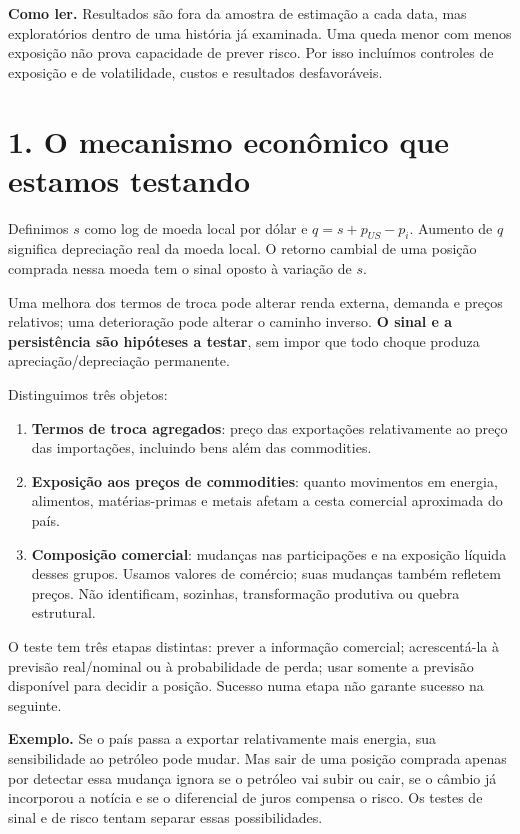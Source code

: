 \documentclass[11pt,a4paper]{article}
\begin{document}
\textbf{Como ler.} Resultados são fora da amostra de estimação a cada data, mas exploratórios dentro de uma história já examinada. Uma queda menor com menos exposição não prova capacidade de prever risco. Por isso incluímos controles de exposição e de volatilidade, custos e resultados desfavoráveis.

\clearpage
\section*{1. O mecanismo econômico que estamos testando}

Definimos $s$ como log de moeda local por dólar e $q=s+p_{US}-p_i$. Aumento de $q$ significa depreciação real da moeda local. O retorno cambial de uma posição comprada nessa moeda tem o sinal oposto à variação de $s$.

Uma melhora dos termos de troca pode alterar renda externa, demanda e preços relativos; uma deterioração pode alterar o caminho inverso. \textbf{O sinal e a persistência são hipóteses a testar}, sem impor que todo choque produza apreciação/depreciação permanente.

Distinguimos três objetos:
\begin{enumerate}
\item \textbf{Termos de troca agregados}: preço das exportações relativamente ao preço das importações, incluindo bens além das commodities.
\item \textbf{Exposição aos preços de commodities}: quanto movimentos em energia, alimentos, matérias-primas e metais afetam a cesta comercial aproximada do país.
\item \textbf{Composição comercial}: mudanças nas participações e na exposição líquida desses grupos. Usamos valores de comércio; suas mudanças também refletem preços. Não identificam, sozinhas, transformação produtiva ou quebra estrutural.
\end{enumerate}

O teste tem três etapas distintas: prever a informação comercial; acrescentá-la à previsão real/nominal ou à probabilidade de perda; usar somente a previsão disponível para decidir a posição. Sucesso numa etapa não garante sucesso na seguinte.

\textbf{Exemplo.} Se o país passa a exportar relativamente mais energia, sua sensibilidade ao petróleo pode mudar. Mas sair de uma posição comprada apenas por detectar essa mudança ignora se o petróleo vai subir ou cair, se o câmbio já incorporou a notícia e se o diferencial de juros compensa o risco. Os testes de sinal e de risco tentam separar essas possibilidades.
\end{document}
